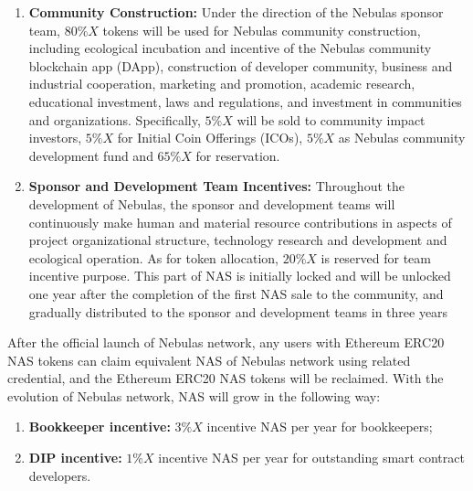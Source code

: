 \begin{enumerate}
	\item \textbf{Community Construction:}
	Under the direction of the Nebulas sponsor team, $80\%X$ tokens will be used for Nebulas community construction, including ecological incubation and incentive of the Nebulas community blockchain app (DApp), construction of developer community, business and industrial cooperation, marketing and promotion, academic research, educational investment, laws and regulations, and investment in communities and organizations. Specifically, $5\%X$ will be sold to community impact investors, $5\%X$ for Initial Coin Offerings (ICOs), $5\%X$ as Nebulas community development fund and $65\%X$ for reservation.
	

	\item \textbf{Sponsor and Development Team Incentives:}
	Throughout the development of Nebulas, the sponsor and development teams will continuously make human and material resource contributions in aspects of project organizational structure, technology research and development and ecological operation. As for token allocation, $20\%X$ is reserved for team incentive purpose. This part of NAS is initially locked and will be unlocked one year after the completion of the first NAS sale to the community, and gradually distributed to the sponsor and development teams in three years
	
\end{enumerate}

After the official launch of Nebulas network, any users with Ethereum ERC20 NAS tokens can claim equivalent NAS of Nebulas network using related credential, and the Ethereum ERC20 NAS tokens will be reclaimed. With the evolution of Nebulas network, NAS will grow in the following way:

\begin{enumerate}
	\item \textbf{Bookkeeper incentive:} $3\%X$ incentive NAS per year for bookkeepers;
	
	\item \textbf{DIP incentive:} $1\%X$ incentive NAS per year for outstanding smart contract developers.
\end{enumerate}